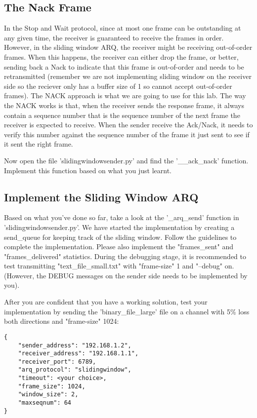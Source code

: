 \documentclass[11pt]{article}
\begin{document}
\subsection{The Nack Frame}
In the Stop and Wait protocol, since at most one frame can be outstanding at any given time, the receiver is guaranteed to receive the frames in order. However, in the sliding window ARQ, the receiver might be receiving out-of-order frames. When this happens, the receiver can either drop the frame, or better, sending back a Nack to indicate that this frame is out-of-order and needs to be retransmitted (remember we are not implementing sliding window on the receiver side so the reciever only has a buffer size of 1 so cannot accept out-of-order frames). The NACK approach is what we are going to use for this lab. The way the NACK works is that, when the receiver sends the response frame, it always contain a sequence number that is the sequence number of the next frame the receiver is expected to receive. When the sender receive the Ack/Nack, it needs to verify this number against the sequence number of the frame it just sent to see if it sent the right frame.

\noindent Now open the file 'slidingwindowsender.py' and find the '\_\_ack\_nack' function. Implement this function based on what you just learnt.

\subsection{Implement the Sliding Window ARQ}
Based on what you've done so far, take a look at the '\_arq\_send' function in 'slidingwindowsender.py'. We have started the implementation by creating a send\_queue for keeping track of the sliding window. Follow the guidelines to complete the implementation. Please also implement the "frames\_sent" and "frames\_delivered" statistics. During the debugging stage, it is recommended to test transmitting "text\_file\_small.txt" with "frame-size" 1 and "--debug" on. (However, the DEBUG messages on the sender side needs to be implemented by you).


\noindent After you are confident that you have a working solution, test your implementation by sending the 'binary\_file\_large' file on a channel with 5\% loss both directions and "frame-size" 1024:
\begin{lstlisting}[caption={Sliding Window Configuration}]
{
    "sender_address": "192.168.1.2",
    "receiver_address": "192.168.1.1",
    "receiver_port": 6789,
    "arq_protocol": "slidingwindow",
    "timeout": <your choice>,
    "frame_size": 1024,
    "window_size": 2,
    "maxseqnum": 64
}
\end{lstlisting}
\end{document}
